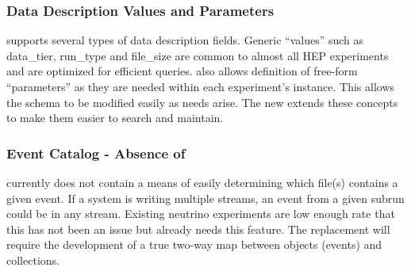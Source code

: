 \documentclass[../main-v1.tex]{subfiles}
\begin{document}
\subsubsection{Data Description Values and Parameters}

  supports several types of data description fields.
  Generic ``values'' such as data\_tier, run\_type and file\_size  are common to almost all  HEP experiments and are optimized for efficient queries.   also allows definition of free-form ``parameters'' as they are needed within each experiment's instance.  This allows the schema to be modified easily as needs arise. The new  extends these concepts to make them easier to search and maintain. 






% 




\subsubsection{Event Catalog - Absence of}
 currently does not contain a means of easily determining which file(s) contains a given event.  If a  system is writing multiple streams, an event from a given subrun could be in any stream.   Existing neutrino experiments are low enough rate that this has not been an issue but  already needs this feature.
The  replacement will require the development of a true two-way map between objects (events) and collections. 
 
\end{document}
